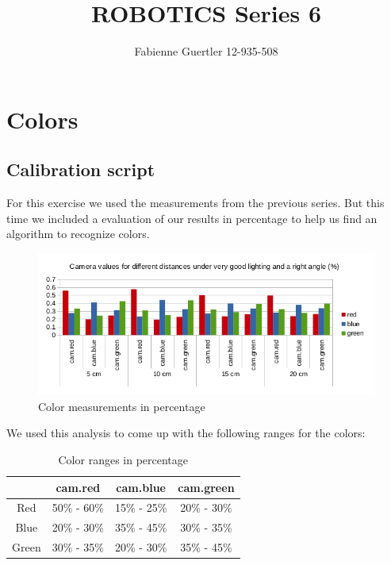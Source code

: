 \documentclass[a4paper]{article}
\title{ROBOTICS Series 6}
\author{Fabienne Guertler 12-935-508}
\begin{document}
	\section{Colors}
		\subsection{Calibration script}
			For this exercise we used the measurements from the previous series. But this time 				    we included a evaluation of our results in percentage to help us find an algorithm
			to recognize colors.
			
			\begin{figure}[h!]
				\includegraphics[width=\linewidth]{CamValuesPerc.png}
				\caption{Color measurements in percentage}
			\end{figure}						
			
			\noindent We used this analysis to come up with the following ranges for the 
			colors:
								
			\begin{table}[h!]
				\begin{center}
				\begin{tabular}{c||c|c|c}
					& cam.red & cam.blue & cam.green\\
					\hline
					\hline
					Red & 50\% - 60\% & 15\% - 25\% & 20\% - 30\% \\
					Blue & 20\% - 30\% & 35\% - 45\% & 30\% - 35\% \\
					Green & 30\% - 35\% & 20\% - 30\% & 35\% - 45\% \\ 
				\end{tabular}
				\caption{Color ranges in percentage}
				\label{tab:ColorRanges}
				\end{center}	
			\end{table}
			
\end{document}
